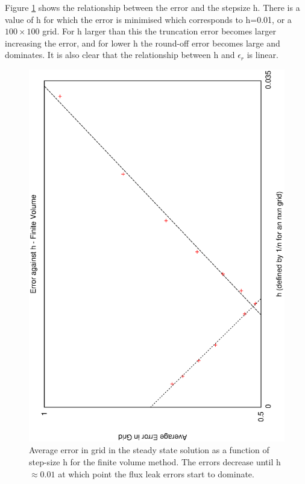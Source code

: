 \documentclass[aps,twocolumn,pre,nofootinbib,10pt]{revtex4-1}
\begin{document}
Figure \ref{fig:fv_opt} shows the relationship between the error and the stepsize h. There is a value of h for which the error is minimised which corresponds to h=0.01, or a $100 \times 100$ grid. For h larger than this the truncation error becomes larger increasing the error, and for lower h the round-off error becomes large and dominates. It is also clear that the relationship between h and \(\epsilon_r\) is linear.
\begin{figure}
\includegraphics[height=\breite \columnwidth,angle=-90]{fv_h.eps}

\caption{Average error in grid in the steady state solution as a function of step-size h for the finite volume method. The errors decrease until h$\approx 0.01$ at which point the flux leak errors start to dominate.}
\label{fig:fv_opt}
\end{figure}
\end{document}
